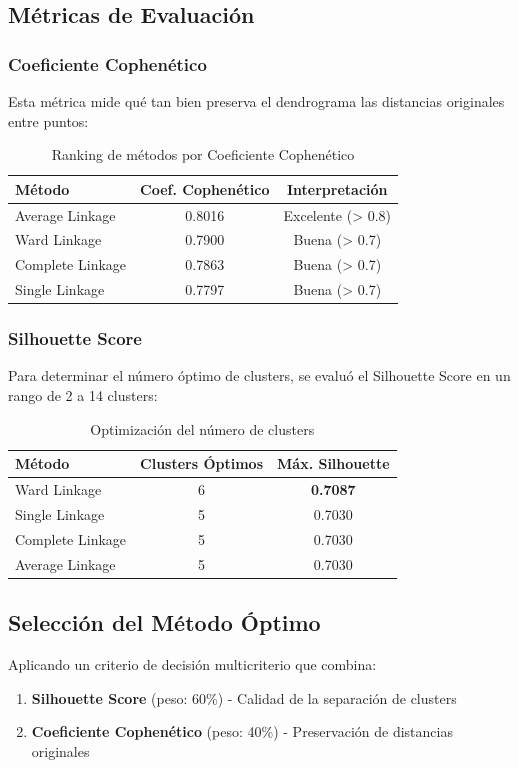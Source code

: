 \documentclass[12pt,a4paper]{article}
\begin{document}
\subsection{Métricas de Evaluación}

\subsubsection{Coeficiente Cophenético}
Esta métrica mide qué tan bien preserva el dendrograma las distancias originales entre puntos:

\begin{table}[H]
\centering
\begin{tabular}{|l|c|c|}
\hline
\textbf{Método} & \textbf{Coef. Cophenético} & \textbf{Interpretación} \\
\hline
Average Linkage & 0.8016 & Excelente (> 0.8) \\
Ward Linkage & 0.7900 & Buena (> 0.7) \\
Complete Linkage & 0.7863 & Buena (> 0.7) \\
Single Linkage & 0.7797 & Buena (> 0.7) \\
\hline
\end{tabular}
\caption{Ranking de métodos por Coeficiente Cophenético}
\end{table}

\subsubsection{Silhouette Score}
Para determinar el número óptimo de clusters, se evaluó el Silhouette Score en un rango de 2 a 14 clusters:

\begin{table}[H]
\centering
\begin{tabular}{|l|c|c|}
\hline
\textbf{Método} & \textbf{Clusters Óptimos} & \textbf{Máx. Silhouette} \\
\hline
Ward Linkage & 6 & \textbf{0.7087} \\
Single Linkage & 5 & 0.7030 \\
Complete Linkage & 5 & 0.7030 \\
Average Linkage & 5 & 0.7030 \\
\hline
\end{tabular}
\caption{Optimización del número de clusters}
\end{table}

\subsection{Selección del Método Óptimo}
Aplicando un criterio de decisión multicriterio que combina:
\begin{enumerate}
    \item \textbf{Silhouette Score} (peso: 60\%) - Calidad de la separación de clusters
    \item \textbf{Coeficiente Cophenético} (peso: 40\%) - Preservación de distancias originales
\end{enumerate}
\end{document}
